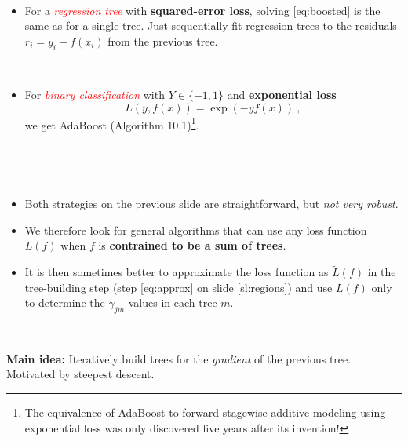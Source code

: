 \documentclass[
  10pt,
  ignorenonframetext,
]{beamer}
\providecommand{\tightlist}{%
  \setlength{\itemsep}{0pt}\setlength{\parskip}{0pt}}
\begin{document}
\begin{frame}
\(~\)

\begin{itemize}
\tightlist
\item
  For a \emph{\textcolor{red}{regression tree}} with
  \textbf{squared-error loss}, solving \eqref{eq:boosted} is the same as
  for a single tree. Just sequentially fit regression trees to the
  residuals \(r_i = y_i - f(x_i)\) from the previous tree.
\end{itemize}

\(~\)

\begin{itemize}
\tightlist
\item
  For \emph{\textcolor{red}{binary classification}} with
  \(Y\in \{-1,1\}\) and \textbf{exponential loss}
  \[L(y,f(x))=\exp(-yf(x)) \ ,\] we get AdaBoost (Algorithm
  10.1)\footnote{The equivalence of AdaBoost to forward stagewise additive modeling using exponential loss was only discovered five years after its invention!}.
\end{itemize}

\(~\)
\end{frame}

\begin{frame}
\(~\)

\begin{itemize}
\tightlist
\item
  Both strategies on the previous slide are straightforward, but
  \emph{not very robust}.
\end{itemize}

\vspace{2mm}

\begin{itemize}
\tightlist
\item
  We therefore look for general algorithms that can use any loss
  function \(L(f)\) when \(f\) is \textbf{contrained to be a sum of
  trees}.
\end{itemize}

\vspace{2mm}

\begin{itemize}
\tightlist
\item
  It is then sometimes better to approximate the loss function as
  \(\tilde{L}(f)\) in the tree-building step (step \eqref{eq:approx} on
  slide \ref{sl:regions}) and use \(L(f)\) only to determine the
  \(\gamma_{jm}\) values in each tree \(m\).
\end{itemize}

\(~\)

\textbf{Main idea:} Iteratively build trees for the \emph{gradient} of
the previous tree. Motivated by steepest descent.
\end{frame}
\end{document}
